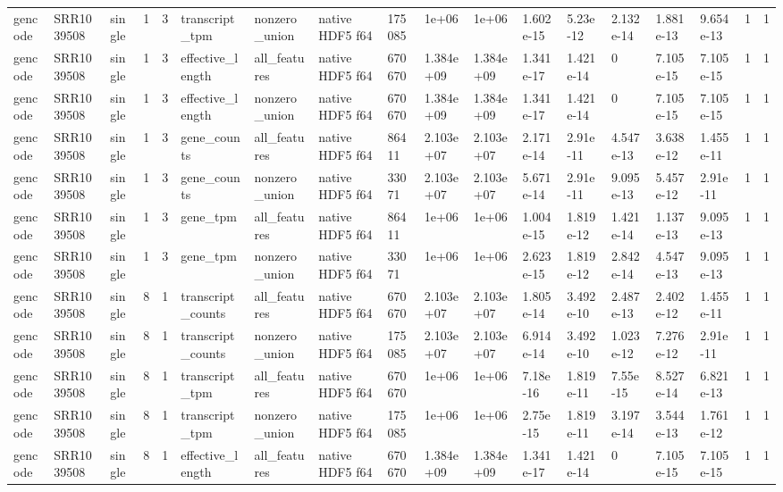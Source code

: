 \begin{tabular}{llllllllllllllllll}
gencode & SRR1039508 & single & 1 & 3 & transcript\_tpm & nonzero\_union & native HDF5 f64 & 175085 & 1e+06 & 1e+06 & 1.602e-15 & 5.23e-12 & 2.132e-14 & 1.881e-13 & 9.654e-13 & 1 & 1 \\
gencode & SRR1039508 & single & 1 & 3 & effective\_length & all\_features & native HDF5 f64 & 670670 & 1.384e+09 & 1.384e+09 & 1.341e-17 & 1.421e-14 & 0 & 7.105e-15 & 7.105e-15 & 1 & 1 \\
gencode & SRR1039508 & single & 1 & 3 & effective\_length & nonzero\_union & native HDF5 f64 & 670670 & 1.384e+09 & 1.384e+09 & 1.341e-17 & 1.421e-14 & 0 & 7.105e-15 & 7.105e-15 & 1 & 1 \\
gencode & SRR1039508 & single & 1 & 3 & gene\_counts & all\_features & native HDF5 f64 & 86411 & 2.103e+07 & 2.103e+07 & 2.171e-14 & 2.91e-11 & 4.547e-13 & 3.638e-12 & 1.455e-11 & 1 & 1 \\
gencode & SRR1039508 & single & 1 & 3 & gene\_counts & nonzero\_union & native HDF5 f64 & 33071 & 2.103e+07 & 2.103e+07 & 5.671e-14 & 2.91e-11 & 9.095e-13 & 5.457e-12 & 2.91e-11 & 1 & 1 \\
gencode & SRR1039508 & single & 1 & 3 & gene\_tpm & all\_features & native HDF5 f64 & 86411 & 1e+06 & 1e+06 & 1.004e-15 & 1.819e-12 & 1.421e-14 & 1.137e-13 & 9.095e-13 & 1 & 1 \\
gencode & SRR1039508 & single & 1 & 3 & gene\_tpm & nonzero\_union & native HDF5 f64 & 33071 & 1e+06 & 1e+06 & 2.623e-15 & 1.819e-12 & 2.842e-14 & 4.547e-13 & 9.095e-13 & 1 & 1 \\
gencode & SRR1039508 & single & 8 & 1 & transcript\_counts & all\_features & native HDF5 f64 & 670670 & 2.103e+07 & 2.103e+07 & 1.805e-14 & 3.492e-10 & 2.487e-13 & 2.402e-12 & 1.455e-11 & 1 & 1 \\
gencode & SRR1039508 & single & 8 & 1 & transcript\_counts & nonzero\_union & native HDF5 f64 & 175085 & 2.103e+07 & 2.103e+07 & 6.914e-14 & 3.492e-10 & 1.023e-12 & 7.276e-12 & 2.91e-11 & 1 & 1 \\
gencode & SRR1039508 & single & 8 & 1 & transcript\_tpm & all\_features & native HDF5 f64 & 670670 & 1e+06 & 1e+06 & 7.18e-16 & 1.819e-11 & 7.55e-15 & 8.527e-14 & 6.821e-13 & 1 & 1 \\
gencode & SRR1039508 & single & 8 & 1 & transcript\_tpm & nonzero\_union & native HDF5 f64 & 175085 & 1e+06 & 1e+06 & 2.75e-15 & 1.819e-11 & 3.197e-14 & 3.544e-13 & 1.761e-12 & 1 & 1 \\
gencode & SRR1039508 & single & 8 & 1 & effective\_length & all\_features & native HDF5 f64 & 670670 & 1.384e+09 & 1.384e+09 & 1.341e-17 & 1.421e-14 & 0 & 7.105e-15 & 7.105e-15 & 1 & 1 \\

\end{tabular}
